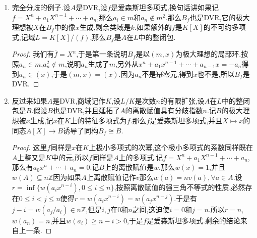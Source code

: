 \begin{enumerate}
\begin{proof}
		特征多项式$f$是$x$在$K$上极小多项式的次幂,$x$的极小多项式的系数都是$A$上整元,并且都在$K$中,按照DVR是正规的,说明$x$的极小多项式是$A$上的多项式,于是$f$是$A$上的多项式.从$f(x)=0$得到$A[X]\to B$可分解为$A[X]\to B_f=A[X]/(f)\to B$.从$\overline{f}(\overline{x})=0$和$\deg\overline{f}=n$得到$\overline{f}$是$\overline{x}$在$k$上的极小多项式,所以不可约的,所以上一条中的条件满足,所以结论成立.
	\end{proof}
	\item 完全分歧的例子.设$A$是DVR,设$f$是爱森斯坦多项式,换句话讲如果记$f=X^n+a_1X^{n-1}+\cdots+a_n$,那么$a_i\in m$和$a_n\not\in m^2$.那么$B_f$也是DVR,它的极大理想被$X$在$B_f$中的像$x$生成,剩余类域是$k$.如果额外的$f$是$K[X]$的不可约多项式,记域$L=K[X]/(f)$,那么$B_f$是$A$在$L$中的整闭包.
	\begin{proof}
		
		我们有$\overline{f}=X^n$,于是第一条说明$B_f$是以$(m,x)$为极大理想的局部环.按照$a_n\in m$,$a_n^2\not\in m$,说明$a_n$生成了$m$,另外从$x^n+a_1x^{n-1}+\cdots+a_{n-1}x=-a_n$得到$a_n\in(x)$,于是$(m,x)=(x)$.因为$a_n$不是幂零元,得到$x$也不是,所以$B_f$是DVR.
	\end{proof}
	\item 反过来如果$A$是DVR,商域记作$K$,设$L/K$是次数$n$的有限扩张,设$A$在$L$中的整闭包是$B$.假设$B$也是DVR,并且延拓了$A$的离散赋值具有分歧指数$n$.记$B$的极大理想被$x$生成,记$x$在$K$上的特征多项式为$f$.那么$f$是爱森斯坦多项式,并且$X\mapsto x$的同态$A[X]\to B$诱导了同构$B_f\cong B$.
	\begin{proof}
		
		这里$f$同样是$x$在$K$上极小多项式的次幂,这个极小多项式的系数同样既在$A$上整又是$K$中的元,所以$f$同样是$A$上的多项式.记$f=X^n+a_1X^{n-1}+\cdots+a_n$,那么有$a_0x^n+\cdots+a_n=0$.记$B$上的离散赋值是$w$,那么$w(x)=1$,并且$w(A)\subseteq n\mathbb{Z}$因为如果$A$上离散赋值记作$v$那么$w(a)=nv(a),\forall a\in A$.设$r=\inf\{w(a_ix^{n-i}),0\le i\le n\}$,按照离散赋值的强三角不等式的性质,必然存在$0\le i<j\le n$使得$r=w(a_ix^{n-i})=w(a_jx^{n-j})$.于是有$j-i=w(a_j/a_i)\in n\mathbb{Z}$,但是$i,j$在$0$和$n$之间,这迫使$i=0$和$j=n$.所以$r=n$,$w(a_n)=n$,并且$w(a_i)\ge n-i>0$,于是$f$是爱森斯坦多项式.剩余的结论来自上一条.
	\end{proof}
\end{enumerate}

